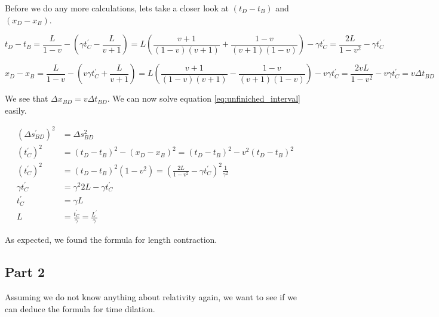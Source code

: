 \documentclass[a4paper,10pt,english]{article}
\begin{document}
\begin{enumerate}
Before we do any more calculations, lets take a closer look at $\left(t_{D}-t_{B}\right)$ and $\left(x_{D}-x_{B}\right)$.

\begin{equation*}
t_{D}-t_{B}=\frac{L}{1-v}-\left(\gamma t_{C}^{\prime}-\frac{L}{v+1}\right)=L\left(\frac{v+1}{(1-v)(v+1)}+\frac{1-v}{(v+1)(1-v)}\right)-\gamma t_{C}^{\prime}=\frac{2L}{1-v^{2}}-\gamma t_{C}^{\prime}
\end{equation*}

\begin{equation*}
x_{D}-x_{B}=\frac{L}{1-v}-\left(v\gamma t_{C}^{\prime}+\frac{L}{v+1}\right)=L\left(\frac{v+1}{(1-v)(v+1)}-\frac{1-v}{(v+1)(1-v)}\right)-v\gamma t_{C}^{\prime}=\frac{2vL}{1-v^{2}}-v\gamma t_{C}^{\prime}=v\Delta t_{BD}
\end{equation*}

We see that $\Delta x_{BD}=v\Delta t_{BD}$. We can now solve equation \ref{eq:unfiniched_interval} easily.

\begin{align*}
\left(\Delta s_{BD}^{\prime}\right)^{2}&=\Delta s_{BD}^{2}\\
\left(t_{C}^{\prime}\right)^{2}&=\left(t_{D}-t_{B}\right)^{2}-\left(x_{D}-x_{B}\right)^{2}=\left(t_{D}-t_{B}\right)^{2}-v^{2}\left(t_{D}-t_{B}\right)^{2}\\
\left(t_{C}^{\prime}\right)^{2}&=\left(t_{D}-t_{B}\right)^{2}\left(1-v^{2}\right)=\left(\frac{2L}{1-v^{2}}-\gamma t_{C}^{\prime}\right)^{2}\frac{1}{\gamma^{2}}\\
\gamma t_{C}^{\prime}&=\gamma^{2}2L-\gamma t_{C}^{\prime}\\
t_{C}^{\prime}&=\gamma L\\
L&=\frac{t_{C}^{\prime}}{\gamma}=\frac{L^{\prime}}{\gamma}
\end{align*}

As expected, we found the formula for length contraction.

\end{enumerate}

\subsection*{Part 2}
Assuming we do not know anything about relativity again, we want to see if we can deduce the formula for time dilation.
\end{document}
